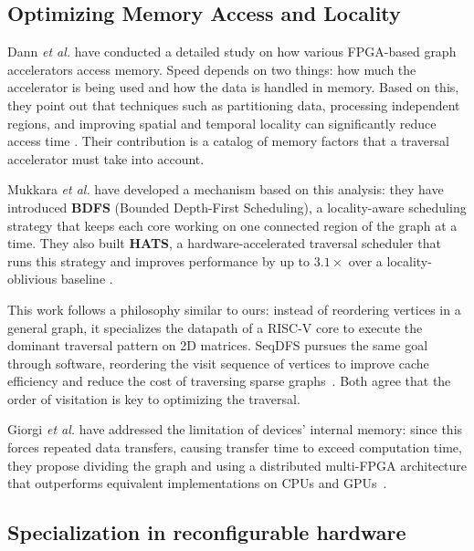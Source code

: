 \documentclass[conference]{IEEEtran}
\begin{document}
\subsection{Optimizing Memory Access and Locality}

Dann \textit{et al.} have conducted a detailed study on how various FPGA-based 
graph accelerators access memory. Speed depends on two things: how much the accelerator is being used and how the data is handled in memory. Based 
on this, they point out that techniques such as partitioning data, processing 
independent regions, and improving spatial and temporal locality can significantly 
reduce access time \cite{dann2021}. Their contribution is a catalog of memory factors 
that a traversal accelerator must take into account.

Mukkara \textit{et al.} have developed a mechanism based on this analysis: they have introduced 
\textbf{BDFS} (Bounded Depth-First Scheduling), a locality-aware scheduling strategy that keeps each core
working on one connected region of the graph at a time. They also built \textbf{HATS},
a hardware-accelerated traversal scheduler that runs this strategy and improves performance by up to $3.1\times$ over a locality-oblivious baseline \cite{mukkara2018}.


This work follows a philosophy similar to ours: instead of reordering vertices 
in a general graph, it specializes the datapath of a RISC-V core to execute the 
dominant traversal pattern on 2D matrices. SeqDFS pursues the same goal through 
software, reordering the visit sequence of vertices to improve cache efficiency 
and reduce the cost of traversing sparse graphs~\cite{Lyu2021SeqDFS}. Both agree 
that the order of visitation is key to optimizing the traversal.

Giorgi \textit{et al.} have addressed the limitation of devices' internal memory: since this 
forces repeated data transfers, causing transfer time to exceed computation time, 
they propose dividing the graph and using a distributed multi-FPGA architecture that 
outperforms equivalent implementations on CPUs and GPUs~\cite{giorgi2023}.

\subsection{Specialization in reconfigurable hardware}
\end{document}
